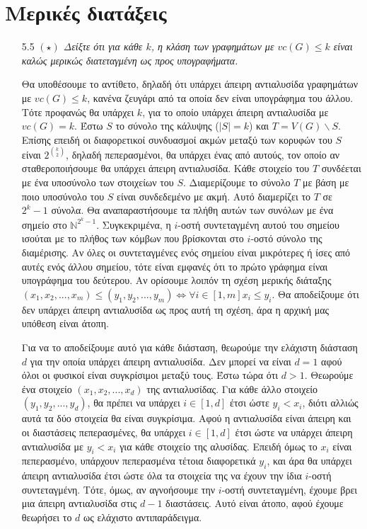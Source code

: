 \documentclass[a4paper, oneside, 11pt]{article}
\theoremstyle{definition}
\begin{document}
\section{Μερικές διατάξεις}
\begin{enumerate}
	\item[5.5] \emph{$(\star)$ Δείξτε ότι για κάθε $k$, η κλάση των γραφημάτων με $vc(G)\leq k$ είναι καλώς μερικώς διατεταγμένη ως προς υπογραφήματα.}

Θα υποθέσουμε το αντίθετο, δηλαδή ότι υπάρχει άπειρη αντιαλυσίδα γραφημάτων με $vc(G)\leq k$, κανένα ζευγάρι από τα οποία δεν είναι υπογράφημα του άλλου. Τότε προφανώς
θα υπάρχει $k$, για το οποίο υπάρχει άπειρη αντιαλυσίδα με $vc(G)=k$. Έστω $S$ το σύνολο της κάλυψης ($|S|=k$) και $T=V(G) \backslash S$.
Επίσης επειδή οι διαφορετικοί συνδυασμοί ακμών μεταξύ των κορυφών του $S$ είναι $2^{{k\choose 2}}$, 
δηλαδή πεπερασμένοι, θα υπάρχει ένας από αυτούς, τον οποίο αν σταθεροποιήσουμε θα υπάρχει άπειρη αντιαλυσίδα. 
 Κάθε στοιχείο του $T$ συνδέεται με ένα υποσύνολο των στοιχείων
του $S$. Διαμερίζουμε το σύνολο $T$ με βάση με ποιο υποσύνολο του $S$ είναι συνδεδεμένο με ακμή. Αυτό διαμερίζει το $T$ σε $2^k-1$ σύνολα. Θα αναπαραστήσουμε τα πλήθη αυτών των συνόλων με ένα
σημείο στο $\mathbb{N}^{2^k-1}$. Συγκεκριμένα, η $i$-οστή συντεταγμένη αυτού του σημείου ισούται με το πλήθος των κόμβων που βρίσκονται στο $i$-οστό σύνολο της διαμέρισης. Αν όλες οι συντεταγμένες ενός 
σημείου είναι μικρότερες ή ίσες από αυτές ενός άλλου σημείου, τότε είναι εμφανές ότι το πρώτο γράφημα είναι υπογράφημα του δεύτερου. Αν ορίσουμε λοιπόν τη σχέση μερικής διάταξης
$(x_1,x_2,...,x_m) \leq (y_1,y_2,...,y_m) \Leftrightarrow \forall i\in [1,m] x_i \leq y_i$. Θα αποδείξουμε ότι δεν υπάρχει άπειρη αντιαλυσίδα ως προς αυτή τη σχέση, άρα η αρχική μας υπόθεση είναι άτοπη.

Για να το αποδείξουμε αυτό για κάθε διάσταση, θεωρούμε την ελάχιστη διάσταση $d$ για την οποία υπάρχει άπειρη αντιαλυσίδα. Δεν μπορεί να είναι $d=1$ αφού όλοι οι φυσικοί είναι συγκρίσιμοι μεταξύ τους. 
Έστω τώρα ότι $d>1$. Θεωρούμε ένα στοιχείο $(x_1,x_2,...,x_d)$ της αντιαλυσίδας. Για κάθε άλλο στοιχείο $(y_1,y_2,...,y_d)$, θα πρέπει να υπάρχει $i\in [1,d]$ έτσι ώστε $y_i<x_i$, διότι αλλιώς αυτά
τα δύο στοιχεία θα είναι συγκρίσιμα. Αφού η αντιαλυσίδα είναι άπειρη και οι διαστάσεις πεπερασμένες, θα υπάρχει $i\in [1,d]$ έτσι ώστε να υπάρχει άπειρη αντιαλυσίδα με $y_i<x_i$ για κάθε στοιχείο της
αλυσίδας.
Επειδή όμως το $x_i$ είναι πεπερασμένο, υπάρχουν πεπερασμένα τέτοια διαφορετικά $y_i$, και άρα θα υπάρχει άπειρη αντιαλυσίδα έτσι ώστε όλα τα στοιχεία της να έχουν την ίδια $i$-οστή συντεταγμένη.
Τότε, όμως, αν αγνοήσουμε την $i$-οστή συντεταγμένη, έχουμε βρει μια άπειρη αντιαλυσίδα στις $d-1$ διαστάσεις. Αυτό είναι άτοπο, αφού έχουμε θεωρήσει το $d$ ως ελάχιστο αντιπαράδειγμα.



\end{enumerate}
\end{document}
